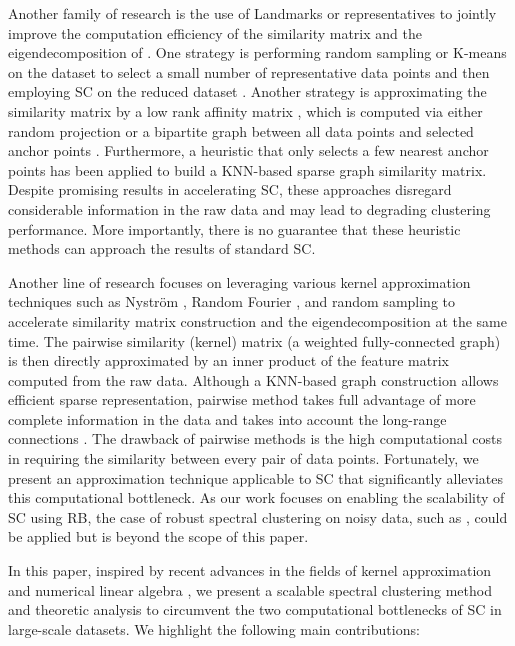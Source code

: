 \documentclass[sigconf]{acmart}
\newcommand{\1}{\boldsymbol{1}}
\newcommand{\0}{\boldsymbol{0}}
\begin{document}
Another family of research is the use of Landmarks or representatives to jointly improve the computation efficiency of the similarity matrix  and the eigendecomposition of . One strategy is performing random sampling or K-means on the dataset to select a small number of representative data points and then employing SC on the reduced dataset \cite{yan2009fast,shinnou2008spectral}. Another strategy \cite{sakai2009fast,chen2011large,liu2013large,li2016scalable} is approximating the similarity matrix  by a low rank affinity matrix , which is computed via either random projection or a bipartite graph between all data points and selected anchor points \cite{liu2010large}. Furthermore, a heuristic that only selects a few nearest anchor points has been applied to build a KNN-based sparse graph similarity matrix. Despite promising results in accelerating SC, these approaches disregard considerable information in the raw data and may lead to degrading clustering performance. More importantly, there is no guarantee that these heuristic methods can approach the results of standard SC.

Another line of research \cite{fowlkes2004spectral,chitta2012efficient,chitta2011approximate,wu2018d2ke,wu2018random} focuses on leveraging various kernel approximation techniques such as Nystr{\"o}m  \cite{williams2001using}, Random Fourier \cite{rahimi2008random,wu2016revisiting,chen2016efficient}, and random sampling to accelerate similarity matrix construction and the eigendecomposition at the same time. The pairwise similarity (kernel) matrix  (a weighted fully-connected graph) is then directly approximated by an inner product of the feature matrix  computed from the raw data. Although a KNN-based graph construction allows efficient sparse representation, pairwise method takes full advantage of more complete information in the data and takes into account the long-range connections \cite{fowlkes2004spectral,chen2011parallel}. The drawback of pairwise methods is the high computational costs in requiring the similarity between every pair of data points. Fortunately, we present an approximation technique applicable to SC that significantly alleviates this computational bottleneck. As our work focuses on enabling the scalability of SC using RB, the case of robust spectral clustering on noisy data, such as \cite{bojchevski2017robust}, 
could be applied but is beyond the scope of this paper.

In this paper, inspired by recent advances in the fields of kernel approximation and numerical linear algebra \cite{rahimi2008random,wu2016revisiting,wu2015preconditioned,wu2017primme_svds,chen2018incremental}, we present a scalable spectral clustering method and theoretic analysis to circumvent the two computational bottlenecks of SC in large-scale datasets. We highlight the following main contributions:
\end{document}
